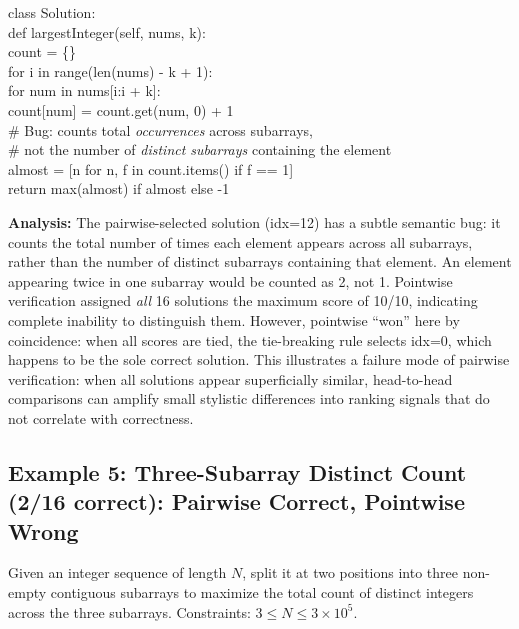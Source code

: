 \begin{tcolorbox}[
    colback=red!5,
    colframe=red!60!black,
    title={\textbf{Pairwise-Selected Solution (idx=12): Incorrect \ding{55}}},
    coltitle=white,
    fonttitle=\small\bfseries,
    breakable,
    enhanced
]
\small\ttfamily
class Solution:\\
\quad def largestInteger(self, nums, k):\\
\quad\quad count = \{\}\\
\quad\quad for i in range(len(nums) - k + 1):\\
\quad\quad\quad for num in nums[i:i + k]:\\
\quad\quad\quad\quad count[num] = count.get(num, 0) + 1\\
\quad\quad \# Bug: counts total \emph{occurrences} across subarrays,\\
\quad\quad \# not the number of \emph{distinct subarrays} containing the element\\
\quad\quad almost = [n for n, f in count.items() if f == 1]\\
\quad\quad return max(almost) if almost else -1
\end{tcolorbox}

\noindent\textbf{Analysis:} The pairwise-selected solution (idx=12) has a subtle semantic bug: it counts the total number of times each element appears across all subarrays, rather than the number of distinct subarrays containing that element. An element appearing twice in one subarray would be counted as 2, not 1. Pointwise verification assigned \emph{all} 16 solutions the maximum score of 10/10, indicating complete inability to distinguish them. However, pointwise ``won'' here by coincidence: when all scores are tied, the tie-breaking rule selects idx=0, which happens to be the sole correct solution. This illustrates a failure mode of pairwise verification: when all solutions appear superficially similar, head-to-head comparisons can amplify small stylistic differences into ranking signals that do not correlate with correctness.


\subsection{Example 5: Three-Subarray Distinct Count (2/16 correct): Pairwise Correct, Pointwise Wrong}

\begin{tcolorbox}[
    colback=promptbg,
    colframe=promptborder,
    title={\textbf{Problem: Maximize sum of distinct counts in three subarrays}},
    coltitle=white,
    fonttitle=\small\bfseries,
    breakable,
    enhanced
]
\small
Given an integer sequence of length $N$, split it at two positions into three non-empty contiguous subarrays to maximize the total count of distinct integers across the three subarrays. Constraints: $3 \leq N \leq 3 \times 10^5$.
\end{tcolorbox}

